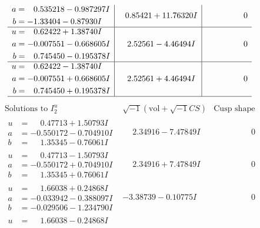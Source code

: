 \documentclass[1p]{elsarticle_modified}
\theoremstyle{definition}
\newcommand{\I}{\sqrt{-1}}
\begin{document}
$$\begin{array}{c|c|c}
\begin{aligned}
a &= \phantom{-}0.535218 - 0.987297 I \\
b &= -1.33404 - 0.87930 I\end{aligned}
 & \phantom{-}0.85421 + 11.76320 I & \phantom{-0.000000 } 0 \\ \hline\begin{aligned}
u &= \phantom{-}0.62422 + 1.38740 I \\
a &= -0.007551 - 0.668605 I \\
b &= \phantom{-}0.745450 - 0.195378 I\end{aligned}
 & \phantom{-}2.52561 - 4.46494 I & \phantom{-0.000000 } 0 \\ \hline\begin{aligned}
u &= \phantom{-}0.62422 - 1.38740 I \\
a &= -0.007551 + 0.668605 I \\
b &= \phantom{-}0.745450 + 0.195378 I\end{aligned}
 & \phantom{-}2.52561 + 4.46494 I & \phantom{-0.000000 } 0\\
 \hline 
 \end{array}$$\newpage$$\begin{array}{c|c|c}  
\text{Solutions to }I^u_{2}& \I (\text{vol} + \sqrt{-1}CS) & \text{Cusp shape}\\
 \hline 
\begin{aligned}
u &= \phantom{-}0.47713 + 1.50793 I \\
a &= -0.550172 - 0.704910 I \\
b &= \phantom{-}1.35345 - 0.76061 I\end{aligned}
 & \phantom{-}2.34916 - 7.47849 I & \phantom{-0.000000 } 0 \\ \hline\begin{aligned}
u &= \phantom{-}0.47713 - 1.50793 I \\
a &= -0.550172 + 0.704910 I \\
b &= \phantom{-}1.35345 + 0.76061 I\end{aligned}
 & \phantom{-}2.34916 + 7.47849 I & \phantom{-0.000000 } 0 \\ \hline\begin{aligned}
u &= \phantom{-}1.66038 + 0.24868 I \\
a &= -0.033942 - 0.388097 I \\
b &= -0.029506 - 1.234790 I\end{aligned}
 & -3.38739 - 0.10775 I & \phantom{-0.000000 } 0 \\ \hline\begin{aligned}
u &= \phantom{-}1.66038 - 0.24868 I \\

\end{aligned}
\end{array}$$
\end{document}
